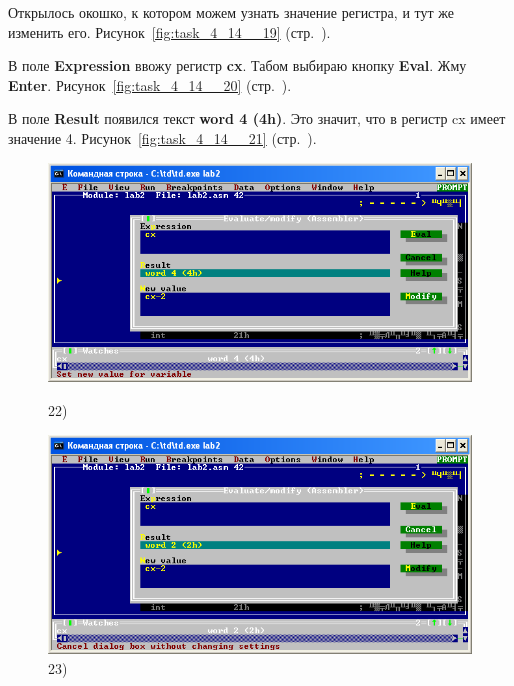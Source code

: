 Открылось окошко, к котором можем узнать значение регистра, и тут же изменить его.
Рисунок~\ref{fig:task_4_14__19} (стр.~\pageref{fig:task_4_14__19}).

В поле \textbf{Expression} ввожу регистр \textbf{cx}.
Табом выбираю кнопку \textbf{Eval}.
Жму \textbf{Enter}.
Рисунок~\ref{fig:task_4_14__20} (стр.~\pageref{fig:task_4_14__20}).

В поле \textbf{Result} появился текст \textbf{word 4 (4h)}.
Это значит, что в регистр cx имеет значение 4.
Рисунок~\ref{fig:task_4_14__21} (стр.~\pageref{fig:task_4_14__21}).

\begin{figure}[!htp]
    \centering
    \begin{minipage}{0.32\textwidth}
        \centering
        \includegraphics[width=.99\linewidth]
            {../_INCLUDES/task-4-14/22.png}
        \caption{22) }
        \label{fig:task_4_14__22}
    \end{minipage}
    \begin {minipage}{0.32\textwidth}
        \centering
        \includegraphics[width=.99\linewidth]
            {../_INCLUDES/task-4-14/23.png}
        \caption{23) }
        \label{fig:task_4_14__23}
    \end{minipage}

\end{figure}
